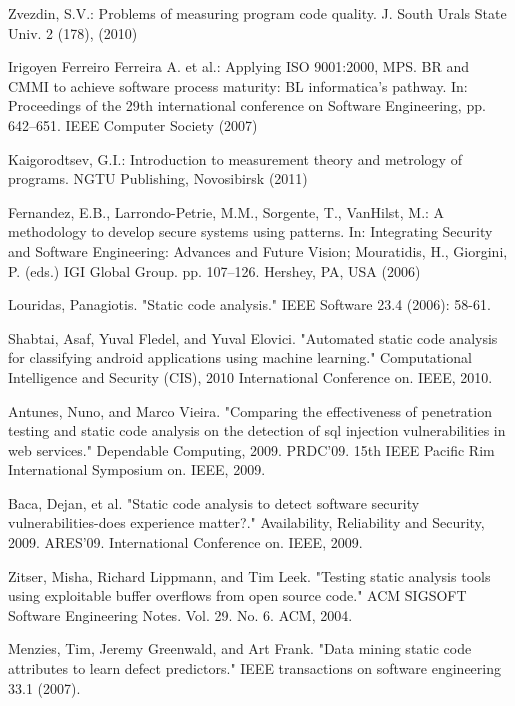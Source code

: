 \documentclass[runningheads,a4paper]{llncs}
\begin{document}
\begin{thebibliography}{4}

 Zvezdin, S.V.: Problems of measuring program code
  quality. J. South Urals State Univ. 2 (178), (2010)

 Irigoyen Ferreiro Ferreira A. et al.: Applying
  ISO 9001:2000, MPS. BR and CMMI to achieve software process
  maturity: BL informatica's pathway. In: Proceedings of the 29th international
  conference on Software Engineering, pp. 642--651. IEEE Computer Society (2007)

 Kaigorodtsev, G.I.: Introduction to measurement theory and
  metrology of programs. NGTU Publishing, Novosibirsk (2011)
  
 Fernandez, E.B., Larrondo-Petrie, M.M., Sorgente, T.,
  VanHilst, M.: A methodology to develop secure systems using patterns. In:
  Integrating Security and Software Engineering: Advances and Future Vision;
  Mouratidis, H., Giorgini, P. (eds.) IGI Global Group. pp. 107--126. Hershey,
  PA, USA (2006)
 
 Louridas, Panagiotis. "Static code analysis." IEEE Software 23.4 (2006): 58-61.

 Shabtai, Asaf, Yuval Fledel, and Yuval Elovici. "Automated static code analysis for classifying android applications using machine learning." Computational Intelligence and Security (CIS), 2010 International Conference on. IEEE, 2010.

 Antunes, Nuno, and Marco Vieira. "Comparing the effectiveness of penetration testing and static code analysis on the detection of sql injection vulnerabilities in web services." Dependable Computing, 2009. PRDC'09. 15th IEEE Pacific Rim International Symposium on. IEEE, 2009.

 Baca, Dejan, et al. "Static code analysis to detect software security vulnerabilities-does experience matter?." Availability, Reliability and Security, 2009. ARES'09. International Conference on. IEEE, 2009.

 Zitser, Misha, Richard Lippmann, and Tim Leek. "Testing static analysis tools using exploitable buffer overflows from open source code." ACM SIGSOFT Software Engineering Notes. Vol. 29. No. 6. ACM, 2004.

 Menzies, Tim, Jeremy Greenwald, and Art Frank. "Data mining static code attributes to learn defect predictors." IEEE transactions on software engineering 33.1 (2007).


\end{thebibliography}
\end{document}
